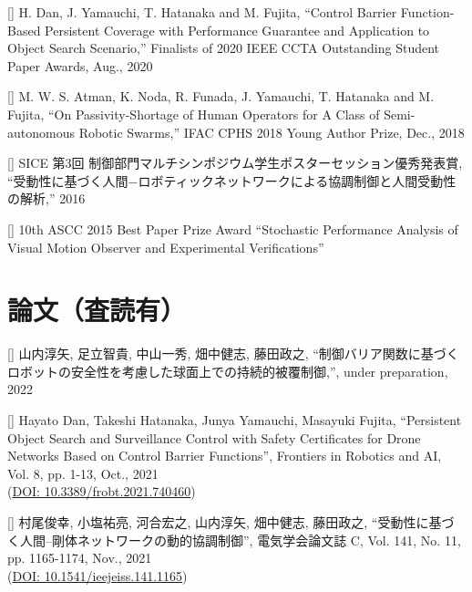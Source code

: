 \documentclass[letterpaper]{article}
\newcounter{award}
\newcounter{trans}
\begin{document}
[] 
  H. Dan, J. Yamauchi, T. Hatanaka and M. Fujita, 
  ``Control Barrier Function-Based Persistent Coverage with Performance Guarantee and Application to Object Search Scenario,'' 
  Finalists of 2020 IEEE CCTA Outstanding Student Paper Awards, Aug., 2020 \\
\addtocounter{award}{-1}

[] 
  M. W. S. Atman, K. Noda, R. Funada, J. Yamauchi, T. Hatanaka and M. Fujita, 
  ``On Passivity-Shortage of Human Operators for A Class of Semi-autonomous Robotic Swarms,'' 
  IFAC CPHS 2018 Young Author Prize, Dec., 2018 \\
\addtocounter{award}{-1}

[] 
  SICE 第3回 制御部門マルチシンポジウム学生ポスターセッション優秀発表賞,
  ``受動性に基づく人間−ロボティックネットワークによる協調制御と人間受動性の解析,'' 2016 \\
\addtocounter{award}{-1}

[]  
  10th ASCC 2015 Best Paper Prize Award
  ``Stochastic Performance Analysis of Visual Motion Observer and Experimental Verifications'' \\
\addtocounter{award}{-1}




\section*{論文（査読有）}

[]  
  山内淳矢, 足立智貴, 中山一秀, 畑中健志, 藤田政之, 
  ``制御バリア関数に基づくロボットの安全性を考慮した球面上での持続的被覆制御,'', 
  under preparation, 2022 \\
\addtocounter{trans}{-1}

[]  
  Hayato Dan, Takeshi Hatanaka, Junya Yamauchi, Masayuki Fujita, 
  ``Persistent Object Search and Surveillance Control with Safety Certificates for Drone Networks Based on Control Barrier Functions'', 
  Frontiers in Robotics and AI, Vol. 8, pp. 1-13, Oct., 2021 \\
  (\href{https://www.frontiersin.org/articles/10.3389/frobt.2021.740460/full}{DOI: 10.3389/frobt.2021.740460}) \\
\addtocounter{trans}{-1}

[]  
  村尾俊幸, 小塩祐亮, 河合宏之, 山内淳矢, 畑中健志, 藤田政之, 
  ``受動性に基づく人間–剛体ネットワークの動的協調制御'', 
  電気学会論文誌 C, Vol. 141, No. 11, pp. 1165-1174, Nov., 2021 \\
  (\href{https://www.jstage.jst.go.jp/article/ieejeiss/141/11/141_1165/_article/-char/ja/}{DOI: 10.1541/ieejeiss.141.1165}) \\
\addtocounter{trans}{-1}
\end{document}
